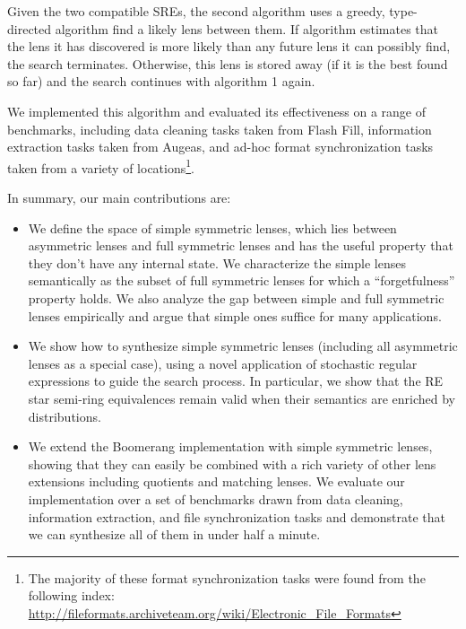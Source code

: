 \documentclass[acmsmall,screen,anonymous]{acmart}
\begin{document}
Given the two compatible SREs,
the second algorithm uses a greedy, type-directed algorithm find a likely lens between them.
If algorithm estimates that the lens it has discovered is more likely than
any future lens it can possibly find, the search terminates.  Otherwise,
this lens is stored away (if it is the best found so far) and the search continues with
algorithm 1 again.

We implemented this algorithm and evaluated its effectiveness on a
range of benchmarks, including data cleaning tasks taken from Flash Fill,
information extraction tasks taken from Augeas, and ad-hoc format
synchronization tasks taken from a variety of locations\footnote{The majority of
  these format synchronization tasks were found from the following index:
  \url{http://fileformats.archiveteam.org/wiki/Electronic_File_Formats}}.

In summary, our main contributions are:
\begin{itemize}
\item We define the space of simple symmetric lenses, which lies between asymmetric lenses and full symmetric lenses and has the useful property that they don't have any internal state.  We characterize
the simple lenses semantically as the subset of full symmetric lenses for which a ``forgetfulness''
property holds. We also analyze the gap between simple and full symmetric lenses empirically and argue that
simple ones suffice for many applications.
\item We show how to synthesize simple symmetric lenses (including all asymmetric lenses as a special case),
using a novel application of stochastic regular expressions to guide the search process.  In particular, we
show that the RE star semi-ring equivalences remain valid when their semantics are enriched by distributions.
\item We extend the Boomerang implementation with simple symmetric lenses,
  showing that they can easily be combined with a rich variety of other lens
  extensions including quotients and matching lenses. We evaluate our
  implementation over a set of benchmarks drawn from data cleaning, information
  extraction, and file synchronization tasks and demonstrate that we can
  synthesize all of them in under half a minute.
\end{itemize}

\end{document}
